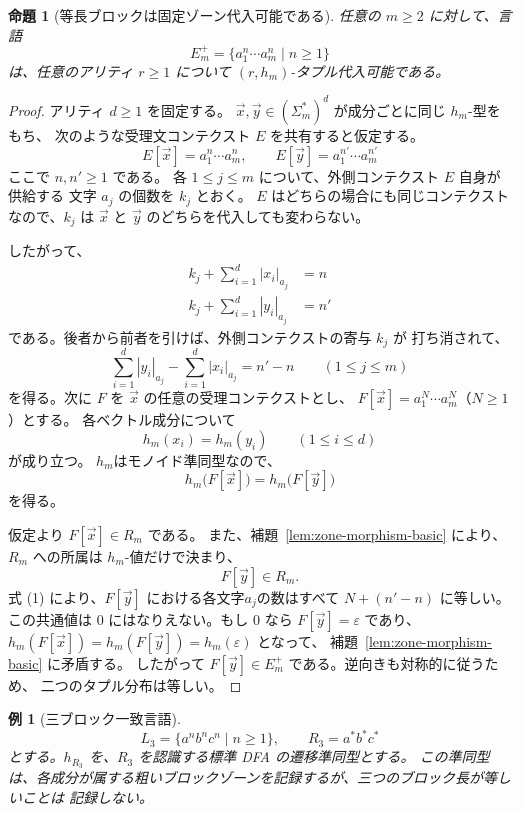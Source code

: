 \documentclass[11pt,a4paper]{ltjsarticle}
\newtheorem{proposition}[theorem]{命題}
\newtheorem{example}[theorem]{例}
\theoremstyle{remark}
\newcommand{\tuple}[1]{\vec{#1}}
\newcommand{\eps}{\varepsilon}
\begin{document}
\begin{proposition}[等長ブロックは固定ゾーン代入可能である]
\label{prop:equality-block-substitutable}
任意の \(m\ge2\) に対して、言語
\[
  E_m^+=\{a_1^n\cdots a_m^n\mid n\ge1\}
\]
は、任意のアリティ \(r\ge1\) について \((r,h_m)\)-タプル代入可能である。
\end{proposition}

\begin{proof}
アリティ \(d\ge1\) を固定する。
\(\tuple x,\tuple y\in(\Sigma_m^*)^d\) が成分ごとに同じ \(h_m\)-型をもち、
次のような受理文コンテクスト \(E\) を共有すると仮定する。
\[
  E[\tuple x]=a_1^n\cdots a_m^n,
  \qquad
  E[\tuple y]=a_1^{n'}\cdots a_m^{n'}
\]
ここで \(n,n'\ge1\) である。
各 \(1\le j\le m\) について、外側コンテクスト \(E\) 自身が供給する
文字 \(a_j\) の個数を \(k_j\) とおく。
\(E\) はどちらの場合にも同じコンテクストなので、\(k_j\) は
\(\tuple x\) と \(\tuple y\) のどちらを代入しても変わらない。

したがって、
\begin{align*}
k_j+\sum_{i=1}^{d}|x_i|_{a_j}&=n\\
k_j+\sum_{i=1}^{d}|y_i|_{a_j}&=n'
\end{align*}
である。後者から前者を引けば、外側コンテクストの寄与 \(k_j\) が
打ち消されて、
\[
  \sum_{i=1}^{d}|y_i|_{a_j}
  -
  \sum_{i=1}^{d}|x_i|_{a_j}
  =n'-n
  \qquad (1\le j\le m)
  \tag{1}
\]
を得る。次に \(F\) を \(\tuple x\) の任意の受理コンテクストとし、
\(F[\tuple x]=a_1^N\cdots a_m^N\)（\(N\ge1\)）とする。
各ベクトル成分について
\[
  h_m(x_i)=h_m(y_i)
  \qquad (1\le i\le d)
\]
が成り立つ。
\(h_m\)はモノイド準同型なので、
\[
  h_m\bigl(F[\tuple x]\bigr)
  =
  h_m\bigl(F[\tuple y]\bigr)
\]
を得る。

仮定より \(F[\tuple x]\in R_m\) である。
また、補題~\ref{lem:zone-morphism-basic} により、
\(R_m\) への所属は \(h_m\)-値だけで決まり、
\[
  F[\tuple y]\in R_m .
\]
式 (1) により、\(F[\tuple y]\) における各文字$a_j$の数はすべて
\(N+(n'-n)\) に等しい。この共通値は 0 にはなりえない。もし 0 なら
\(F[\tuple y]=\eps\) であり、
\(h_m(F[\tuple x])=h_m(F[\tuple y])=h_m(\eps)\) となって、
補題~\ref{lem:zone-morphism-basic} に矛盾する。
したがって \(F[\tuple y]\in E_m^+\) である。逆向きも対称的に従うため、
二つのタプル分布は等しい。
\end{proof}

\begin{example}[三ブロック一致言語]
\label{ex:l3-language}
\[
  L_3=\{a^n b^n c^n\mid n\ge1\},
  \qquad R_3=a^*b^*c^*
\]
とする。\(h_{R_3}\) を、\(R_3\) を認識する標準 DFA の遷移準同型とする。
この準同型は、各成分が属する粗いブロックゾーンを記録するが、三つのブロック長が等しいことは
記録しない。
\end{example}
\end{document}
